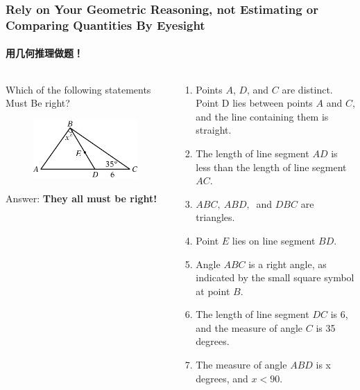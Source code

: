 \documentclass[
	11pt, %
	handout,
]{beamer}
\begin{document}

\begin{frame}
	\frametitle{Rely on Your Geometric Reasoning, not Estimating or Comparing Quantities By Eyesight} %
	\framesubtitle{用几何推理做题！}
	\begin{columns}[t] 
		\begin{column}{0.4\textwidth} %
		Which of the following statements \alert{Must Be} right?
			\begin{figure}
				\includegraphics[width=\linewidth]{Not_Scale.jpg}
			\end{figure}
				Answer: \textbf{\alert{They all must be right!}}
		\end{column}

	\begin{column}{0.6\textwidth} %
	\begin{enumerate}
		\item Points $A$, $D$, and $C$ are distinct. Point D lies between points $A$ and $C$, and the line containing them is straight.
		\item The length of line segment $AD$ is less than the length of line segment $AC$.
		\item $ABC,\ ABD,\ $ and $DBC$ are triangles.
		\item Point $E$ lies on line segment $BD$.
		\item Angle $ABC$ is a right angle, as indicated by the small square symbol at point $B$.
		\item The length of line segment $DC$ is 6, and the measure of angle $C$ is 35 degrees.
		\item The measure of angle $ABD$ is x degrees, and $x<90$.
	\end{enumerate}
	\end{column}
	\end{columns}
\end{frame}
\end{document}

